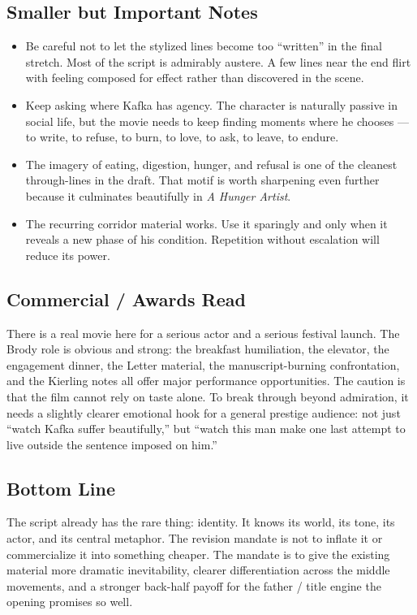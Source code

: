 \subsection{Smaller but Important Notes}

\begin{itemize}
\item Be careful not to let the stylized lines become too ``written'' in the final stretch. Most of the script is admirably austere. A few lines near the end flirt with feeling composed for effect rather than discovered in the scene.
\item Keep asking where Kafka has agency. The character is naturally passive in social life, but the movie needs to keep finding moments where he chooses --- to write, to refuse, to burn, to love, to ask, to leave, to endure.
\item The imagery of eating, digestion, hunger, and refusal is one of the cleanest through-lines in the draft. That motif is worth sharpening even further because it culminates beautifully in \emph{A Hunger Artist}.
\item The recurring corridor material works. Use it sparingly and only when it reveals a new phase of his condition. Repetition without escalation will reduce its power.
\end{itemize}

\subsection{Commercial / Awards Read}

There is a real movie here for a serious actor and a serious festival launch. The Brody role is obvious and strong: the breakfast humiliation, the elevator, the engagement dinner, the Letter material, the manuscript-burning confrontation, and the Kierling notes all offer major performance opportunities. The caution is that the film cannot rely on taste alone. To break through beyond admiration, it needs a slightly clearer emotional hook for a general prestige audience: not just ``watch Kafka suffer beautifully,'' but ``watch this man make one last attempt to live outside the sentence imposed on him.''

\subsection{Bottom Line}

The script already has the rare thing: identity. It knows its world, its tone, its actor, and its central metaphor. The revision mandate is not to inflate it or commercialize it into something cheaper. The mandate is to give the existing material more dramatic inevitability, clearer differentiation across the middle movements, and a stronger back-half payoff for the father / title engine the opening promises so well.
